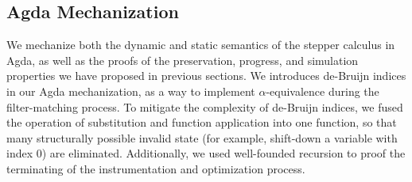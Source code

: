 \subsection{Agda Mechanization}

We mechanize both the dynamic and static semantics of the stepper
calculus in Agda, as well as the proofs of the preservation, progress,
and simulation properties we have proposed in previous sections. We
introduces de-Bruijn indices in our Agda mechanization, as a way to
implement \(\alpha\)-equivalence during the filter-matching
process. To mitigate the complexity of de-Bruijn indices, we fused
the operation of substitution and function application into one
function, so that many structurally possible invalid state (for
example, shift-down a variable with index 0) are
eliminated. Additionally, we used well-founded recursion to proof the
terminating of the instrumentation and optimization process.

